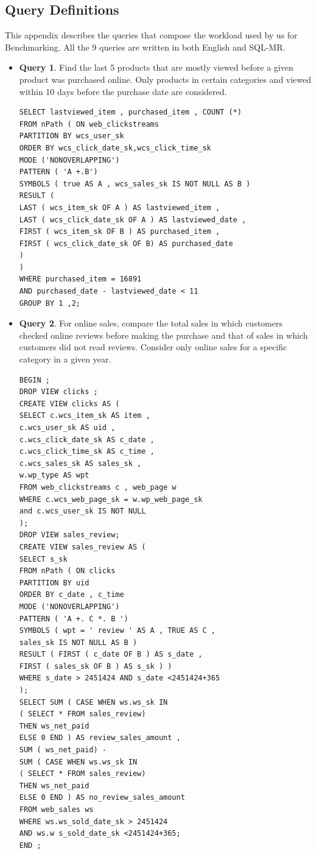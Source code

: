 \documentclass[12pt]{book}
\begin{document}
\begin{appendices}
\chapter{Query Definitions}
\label{appendixa}
This appendix describes the queries that compose the workload used by us for Benchmarking. 
All the 9 queries are written in both English and SQL-MR.
\begin{itemize}
 \item \textbf{Query 1}. Find the last 5 products that are mostly viewed before a given product was purchased online. Only products in 
 certain categories and viewed within 10 days before the purchase date are considered.
\lstset{language=SQL,basicstyle=\ttfamily}
\begin{lstlisting}[frame=single]
SELECT lastviewed_item , purchased_item , COUNT (*)
FROM nPath ( ON web_clickstreams
PARTITION BY wcs_user_sk
ORDER BY wcs_click_date_sk,wcs_click_time_sk
MODE ('NONOVERLAPPING')
PATTERN ( 'A +.B')
SYMBOLS ( true AS A , wcs_sales_sk IS NOT NULL AS B )
RESULT (
LAST ( wcs_item_sk OF A ) AS lastviewed_item ,
LAST ( wcs_click_date_sk OF A ) AS lastviewed_date ,
FIRST ( wcs_item_sk OF B ) AS purchased_item ,
FIRST ( wcs_click_date_sk OF B) AS purchased_date
)
)
WHERE purchased_item = 16891
AND purchased_date - lastviewed_date < 11
GROUP BY 1 ,2;
\end{lstlisting}
\item \textbf{Query 2}. For online sales, compare the total sales in which customers checked online reviews before making the purchase and 
that of sales in which customers did not read reviews. Consider only online sales for a specific category in a given year.
\begin{lstlisting}[frame=single]
BEGIN ;
DROP VIEW clicks ;
CREATE VIEW clicks AS (
SELECT c.wcs_item_sk AS item ,
c.wcs_user_sk AS uid ,
c.wcs_click_date_sk AS c_date ,
c.wcs_click_time_sk AS c_time ,
c.wcs_sales_sk AS sales_sk ,
w.wp_type AS wpt
FROM web_clickstreams c , web_page w
WHERE c.wcs_web_page_sk = w.wp_web_page_sk
and c.wcs_user_sk IS NOT NULL
);
DROP VIEW sales_review;
CREATE VIEW sales_review AS (
SELECT s_sk
FROM nPath ( ON clicks
PARTITION BY uid
ORDER BY c_date , c_time
MODE ('NONOVERLAPPING')
PATTERN ( 'A +. C *. B ')
SYMBOLS ( wpt = ' review ' AS A , TRUE AS C ,
sales_sk IS NOT NULL AS B )
RESULT ( FIRST ( c_date OF B ) AS s_date ,
FIRST ( sales_sk OF B ) AS s_sk ) )
WHERE s_date > 2451424 AND s_date <2451424+365
);
SELECT SUM ( CASE WHEN ws.ws_sk IN 
( SELECT * FROM sales_review)
THEN ws_net_paid
ELSE 0 END ) AS review_sales_amount ,
SUM ( ws_net_paid) -
SUM ( CASE WHEN ws.ws_sk IN 
( SELECT * FROM sales_review)
THEN ws_net_paid
ELSE 0 END ) AS no_review_sales_amount
FROM web_sales ws
WHERE ws.ws_sold_date_sk > 2451424
AND ws.w s_sold_date_sk <2451424+365;
END ;
\end{lstlisting}


\end{itemize}
\end{appendices}
\end{document}
